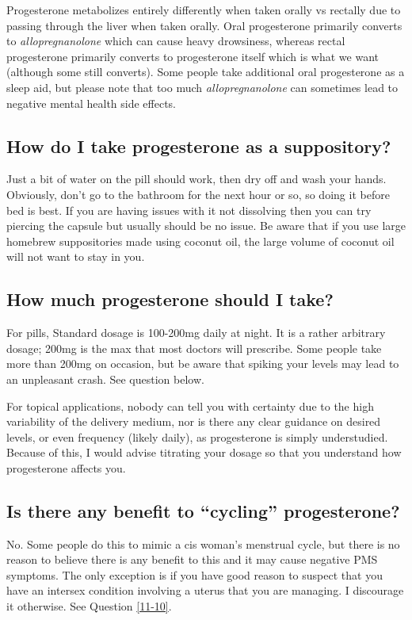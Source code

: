 \documentclass{article}
\begin{document}
Progesterone metabolizes entirely differently when taken orally vs rectally due to passing through the liver when taken orally. Oral progesterone primarily converts to \textit{allopregnanolone} which can cause heavy drowsiness, whereas rectal progesterone primarily converts to progesterone itself which is what we want (although some still converts). Some people take additional oral progesterone as a sleep aid, but please note that too much \textit{allopregnanolone }can sometimes lead to negative mental health side effects.

\subsection{How do I take progesterone as a suppository?}

Just a bit of water on the pill should work, then dry off and wash your hands. Obviously, don’t go to the bathroom for the next hour or so, so doing it before bed is best. If you are having issues with it not dissolving then you can try piercing the capsule but usually should be no issue. Be aware that if you use large homebrew suppositories made using coconut oil, the large volume of coconut oil will not want to stay in you.

\subsection{How much progesterone should I take?}

For pills, Standard dosage is 100-200mg daily at night. It is a rather arbitrary dosage; 200mg is the max that most doctors will prescribe. Some people take more than 200mg on occasion, but be aware that spiking your levels may lead to an unpleasant crash. See question below.

For topical applications, nobody can tell you with certainty due to the high variability of the delivery medium, nor is there any clear guidance on desired levels, or even frequency (likely daily), as progesterone is simply understudied. Because of this, I would advise titrating your dosage so that you understand how progesterone affects you.

\subsection{Is there any benefit to “cycling” progesterone?}\label{8-11}

No. Some people do this to mimic a cis woman’s menstrual cycle, but there is no reason to believe there is any benefit to this and it may cause negative PMS symptoms. The only exception is if you have good reason to suspect that you have an intersex condition involving a uterus that you are managing. I discourage it otherwise. See Question \ref{11-10}.
\end{document}

